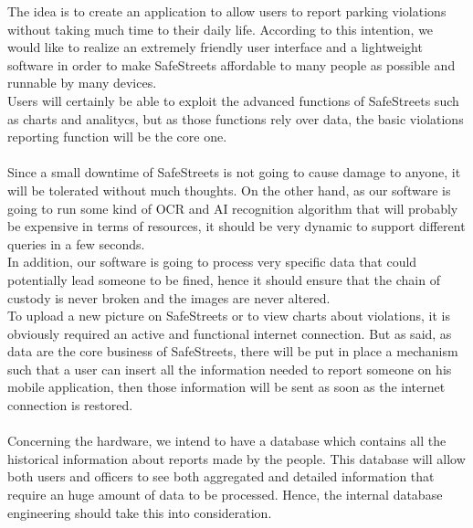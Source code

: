 The idea is to create an application to allow users to report parking violations without taking much time to their daily life. According to this intention, we would like to realize an extremely friendly user interface and a lightweight software in order to make SafeStreets affordable to many people as possible and runnable by many devices.\\
Users will certainly be able to exploit the advanced functions of SafeStreets such as charts and analitycs, but as those functions rely over data, the basic violations reporting function will be the core one.\\
\\
Since a small downtime of SafeStreets is not going to cause damage to anyone, it will be tolerated without much thoughts. On the other hand, as our software is going to run some kind of OCR and AI recognition algorithm that will probably be expensive in terms of resources, it should be very dynamic to support different queries in a few seconds.\\
In addition, our software is going to process very specific data that could potentially lead someone to be fined, hence it should ensure that the chain of custody is never broken and the images are never altered.\\
To upload a new picture on SafeStreets or to view charts about violations, it is obviously required an active and functional internet connection. But as said, as data are the core business of SafeStreets, there will be put in place a mechanism such that a user can insert all the information needed to report someone on his mobile application, then those information will be sent as soon as the internet connection is restored.\\
\\
Concerning the hardware, we intend to have a database which contains all the historical information about reports made by the people. This database will allow both users and officers to see both aggregated and detailed information that require an huge amount of data to be processed. Hence, the internal database engineering should take this into consideration.\\